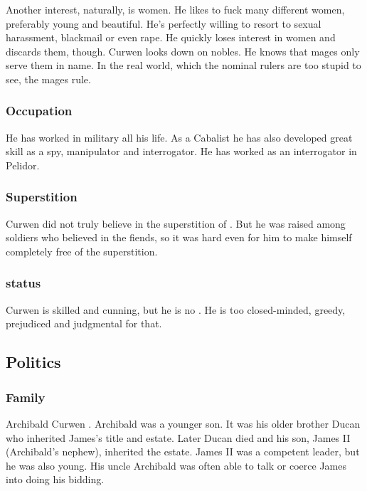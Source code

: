 Another interest, naturally, is women. 
He likes to fuck many different women, preferably young and beautiful. 
He's perfectly willing to resort to sexual harassment, blackmail or even rape. 
He quickly loses interest in women and discards them, though. 
Curwen looks down on nobles. 
He knows that mages only serve them in name. 
In the real world, which the nominal rulers are too stupid to see, the mages rule. 





\subsubsection{Occupation}
He has worked in military \ishroth{} all his life. 
As a Cabalist he has also developed great skill as a spy, manipulator and interrogator. 
He has worked as an interrogator in Pelidor. 





\subsubsection{Superstition}
Curwen did not truly believe in the superstition of . 
But he was raised among soldiers who believed in the fiends, so it was hard even for him to make himself completely free of the superstition. 





\subsubsection{\Vertex{} status}
Curwen is skilled and cunning, but he is no \vertex.
He is too closed-minded, greedy, prejudiced and judgmental for that.









\subsection{Politics}





\subsubsection{Family}
Archibald Curwen . 
Archibald was a younger son. 
It was his older brother Ducan who inherited James's title and estate. 
Later Ducan died and his son, James II (Archibald's nephew), inherited the estate. 
James II was a competent leader, but he was also young. 
His uncle Archibald was often able to talk or coerce James into doing his bidding. 






